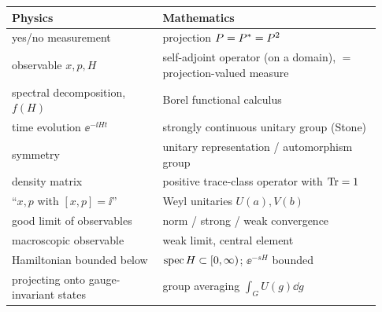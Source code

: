 \begin{dictbox}
\renewcommand{\arraystretch}{1.3}
\begin{tabular}{@{}p{0.38\linewidth}p{0.55\linewidth}@{}}
\textbf{Physics} & \textbf{Mathematics}\\
\hline
yes/no measurement & projection $P=P^{*}=P^2$\\
observable $x,p,H$ & self-adjoint operator (on a domain), $=$ projection-valued measure\\
spectral decomposition, $f(H)$ & Borel functional calculus\\
time evolution $\ee^{-\ii Ht}$ & strongly continuous unitary group (Stone)\\
symmetry & unitary representation / automorphism group\\
density matrix & positive trace-class operator with $\operatorname{Tr}=1$\\
``$x,p$ with $[x,p]=\ii$'' & Weyl unitaries $U(a),V(b)$\\
good limit of observables & norm / strong / weak convergence\\
macroscopic observable & weak limit, central element\\
Hamiltonian bounded below & $\operatorname{spec} H\subset[0,\infty)$; $\ee^{-sH}$ bounded\\
projecting onto gauge-invariant states & group averaging $\int_G U(g)\dd g$\\
\end{tabular}
\end{dictbox}
